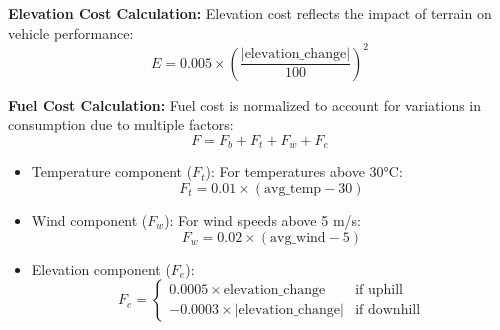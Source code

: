 \textbf{Elevation Cost Calculation:}
Elevation cost reflects the impact of terrain on vehicle performance:
\begin{equation}
    E = 0.005 \times \left( \frac{|\text{elevation\_change}|}{100} \right)^2
\end{equation}

\textbf{Fuel Cost Calculation:}
Fuel cost is normalized to account for variations in consumption due to multiple factors:
\begin{equation}
    F = F_b + F_t + F_w + F_e
\end{equation}

\begin{itemize}
    \item Temperature component ($F_t$): For temperatures above 30°C:
          \begin{equation}
              F_t = 0.01 \times (\text{avg\_temp} - 30)
          \end{equation}

    \item Wind component ($F_w$): For wind speeds above 5 m/s:
          \begin{equation}
              F_w = 0.02 \times (\text{avg\_wind} - 5)
          \end{equation}

    \item Elevation component ($F_e$):
          \begin{equation}
              F_e =
              \begin{cases}
                  0.0005 \times \text{elevation\_change}    & \text{if uphill}   \\
                  -0.0003 \times |\text{elevation\_change}| & \text{if downhill}
              \end{cases}
          \end{equation}
\end{itemize}

